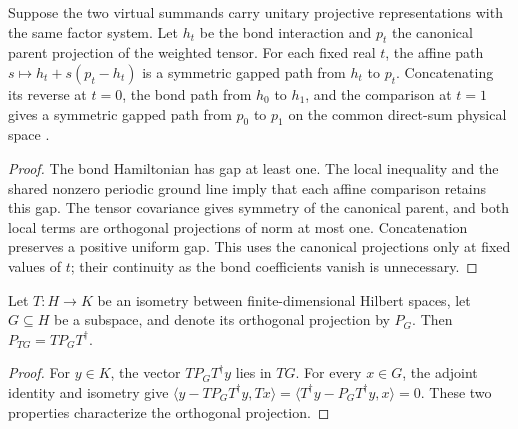 \begin{definition}
    \label{def:spt_weighted_canonical_parent_path}
    \leanok
    Suppose the two virtual summands carry unitary projective
    representations with the same factor system. Let $h_t$ be the bond
    interaction and $p_t$ the canonical parent projection of the weighted
    tensor. For each fixed real $t$, the affine path
    $s\mapsto h_t+s(p_t-h_t)$ is a symmetric gapped path from $h_t$ to $p_t$.
    Concatenating its reverse at $t=0$, the bond path from $h_0$ to $h_1$,
    and the comparison at $t=1$ gives a symmetric gapped path from $p_0$
    to $p_1$ on the common direct-sum physical space
    \cite[Section~II.F.2]{Schuch2011Phases}.
\end{definition}

\begin{proof}\leanok
    The bond Hamiltonian has gap at least one. The local inequality and
    the shared nonzero periodic ground line imply that each affine
    comparison retains this gap. The tensor covariance gives symmetry of
    the canonical parent, and both local terms are orthogonal projections
    of norm at most one. Concatenation preserves a positive uniform gap.
    This uses the canonical projections only at fixed values of $t$;
    their continuity as the bond coefficients vanish is unnecessary.
\end{proof}

\begin{lemma}
    \label{thm:spt_isometric_image_projection}
    \leanok
    Let $T:H\to K$ be an isometry between finite-dimensional Hilbert
    spaces, let $G\subseteq H$ be a subspace, and denote its orthogonal
    projection by $P_G$. Then $P_{TG}=TP_GT^\dagger$.
\end{lemma}

\begin{proof}\leanok
    For $y\in K$, the vector $TP_GT^\dagger y$ lies in $TG$.
    For every $x\in G$, the adjoint identity and isometry give
    $\langle y-TP_GT^\dagger y,Tx\rangle
        =\langle T^\dagger y-P_GT^\dagger y,x\rangle=0$.
    These two properties characterize the orthogonal projection.
\end{proof}

